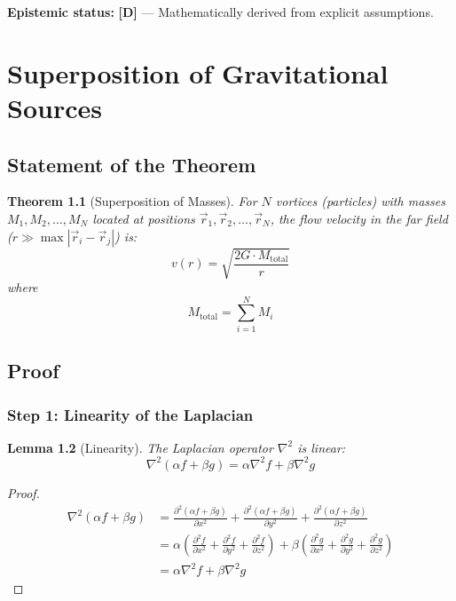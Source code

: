 \documentclass[12pt,a4paper,openany]{book}
\theoremstyle{definition}
\theoremstyle{plain}
\newtheorem{theorem}{Theorem}[chapter]
\newtheorem{lemma}[theorem]{Lemma}
\theoremstyle{remark}
\newcommand{\derived}{\textcolor{derivedcolor}{\textbf{[D]}}}
\begin{document}
\textbf{Epistemic status:} \derived{} — Mathematically derived from explicit assumptions.

\chapter{Superposition of Gravitational Sources}

\section{Statement of the Theorem}

\begin{theorem}[Superposition of Masses]
\label{thm:superposition}
For $N$ vortices (particles) with masses $M_1, M_2, \ldots, M_N$ located at positions $\vec{r}_1, \vec{r}_2, \ldots, \vec{r}_N$, the flow velocity in the far field ($r \gg \max|\vec{r}_i - \vec{r}_j|$) is:
\begin{equation}
v(r) = \sqrt{\frac{2G \cdot M_{\text{total}}}{r}}
\label{eq:superposition}
\end{equation}
where
\begin{equation}
M_{\text{total}} = \sum_{i=1}^{N} M_i
\label{eq:mtotal}
\end{equation}
\end{theorem}

\section{Proof}

\subsection{Step 1: Linearity of the Laplacian}

\begin{lemma}[Linearity]
The Laplacian operator $\nabla^2$ is linear:
\begin{equation}
\nabla^2(\alpha f + \beta g) = \alpha \nabla^2 f + \beta \nabla^2 g
\label{eq:linearity}
\end{equation}
\end{lemma}

\begin{proof}
\begin{align}
\nabla^2(\alpha f + \beta g) &= \frac{\partial^2(\alpha f + \beta g)}{\partial x^2} + \frac{\partial^2(\alpha f + \beta g)}{\partial y^2} + \frac{\partial^2(\alpha f + \beta g)}{\partial z^2} \\
&= \alpha\left(\frac{\partial^2 f}{\partial x^2} + \frac{\partial^2 f}{\partial y^2} + \frac{\partial^2 f}{\partial z^2}\right) + \beta\left(\frac{\partial^2 g}{\partial x^2} + \frac{\partial^2 g}{\partial y^2} + \frac{\partial^2 g}{\partial z^2}\right) \\
&= \alpha \nabla^2 f + \beta \nabla^2 g
\end{align}
\end{proof}
\end{document}
